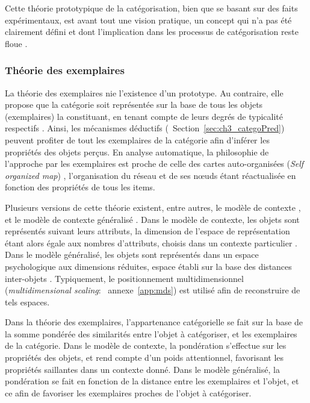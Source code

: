 Cette théorie prototypique de la catégorisation, bien que se basant sur des faits expérimentaux, est avant tout une vision pratique, un concept qui n'a pas été clairement défini et dont l'implication dans les processus de catégorisation reste floue \citep[p. 36-40]{rosch1978cognition} \citep[p. 49-54]{dubois1991semantique}.

\subsubsection{Théorie des exemplaires}

La théorie des exemplaires nie l'existence d'un prototype. Au contraire, elle propose que la catégorie soit représentée sur la base de tous les objets (exemplaires) la constituant, en tenant compte de leurs degrés de typicalité respectifs \citep{medin1978context,nosofsky1986attention,nosofsky1992similarity}. Ainsi, les mécanismes déductifs (\cf~Section~\ref{sec:ch3_categoPred}) peuvent profiter de tout les exemplaires de la catégorie afin d'inférer les propriétés des objets perçus. En analyse automatique, la philosophie de l'approche par les exemplaires est proche de celle des cartes auto-organisées (\emph{Self organized map}) \citep{kohonen1995som}, l’organisation du réseau et de ses nœuds étant réactualisée en fonction des propriétés de tous les items.

Plusieurs versions de cette théorie existent, entre autres, le modèle de contexte \citep{medin1978context}, et le modèle de contexte généralisé \citep{nosofsky1986attention}. Dans le modèle de contexte, les objets sont représentés suivant leurs attributs, la dimension de l'espace de représentation étant alors égale aux nombres d'attributs, choisis dans un contexte particulier \citep{hitzman1986schema}. Dans le modèle généralisé, les objets sont représentés dans un espace psychologique aux dimensions réduites, espace établi sur la base des distances inter-objets \citep{nosofsky1992similarity}. Typiquement, le positionnement multidimensionnel (\emph{multidimensional scaling}: \cf~annexe~\ref{app:mds}) est utilisé afin de reconstruire de tels espaces.

Dans la théorie des exemplaires, l'appartenance catégorielle se fait sur la base de la somme pondérée des similarités entre l'objet à catégoriser, et les exemplaires de la catégorie. Dans le modèle de contexte, la pondération s'effectue sur les propriétés des objets, et rend compte d'un poids attentionnel, favorisant les propriétés saillantes dans un contexte donné. Dans le modèle généralisé, la pondération se fait en fonction de la distance entre les exemplaires et l’objet, et ce afin de favoriser les exemplaires proches de l'objet à catégoriser.

